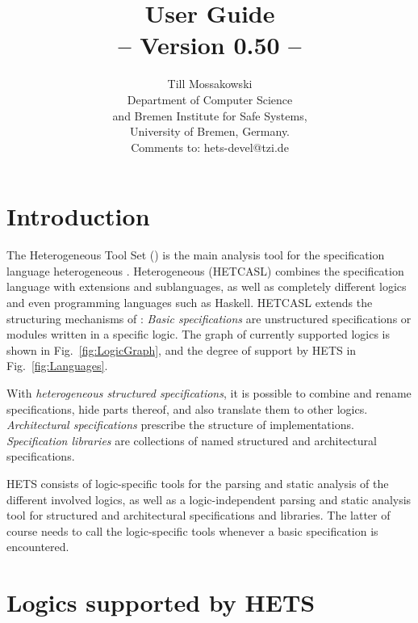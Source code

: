 \documentclass{article}
\newcommand{\normalTEXTSC}[2]{{#1\scriptsize#2}}
\newcommand{\LARGETEXTSC} [2]{{\LARGE     #1\large     #2}}
\newcommand     {\Hets}{\normalTEXTSC{H}{ETS}\xspace}
\newcommand{\LARGEHets} {\LARGETEXTSC{H}{ETS}\xspace}
\newcommand{\HetCASL}{\normalTEXTSC{H}{ET}\normalTEXTSC{C}{ASL}\xspace}
\begin{document}
\title{{\bf \protect{\LARGEHets} User Guide}\\ 
-- Version 0.50 --}
\author{Till Mossakowski\\[1em]
Department of Computer Science\\ and Bremen
Institute for Safe Systems,\\ University of Bremen, Germany.\\[1em]
Comments to: hets-devel@tzi.de
}

\maketitle

\section{Introduction}


The Heterogeneous Tool Set (\protect\Hets) is the main analysis tool
for the specification language heterogeneous \CASL. Heterogeneous
\CASL (\HetCASL) combines the specification language \CASL with \CASL extensions
and sublanguages, as well as completely different logics and even
programming languages such as Haskell. \HetCASL
extends the structuring mechanisms of \CASL:
\emph{Basic specifications} are
unstructured specifications or modules written in a specific logic.
The graph of currently supported logics is shown in Fig.~\ref{fig:LogicGraph},
and the degree of support by \Hets in Fig.~\ref{fig:Languages}.

With \emph{heterogeneous structured specifications}, it is possible to
combine and rename specifications, hide parts thereof, and also
translate them to other logics. \emph{Architectural specifications}
prescribe the structure of implementations.  \emph{Specification
  libraries} are collections of named structured and architectural
specifications. 

\Hets consists of logic-specific tools for the parsing and static
analysis of the different involved logics, as well as a
logic-independent parsing and static analysis tool for structured and
architectural specifications and libraries. The latter of course needs
to call the logic-specific tools whenever a basic specification is
encountered.

\section{Logics supported by \Hets}
\end{document}
